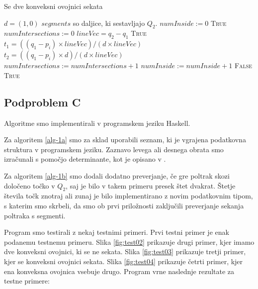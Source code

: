 \documentclass{article}
\begin{document}
\begin{algorithm}
	\caption{Se dve konveksni ovojnici sekata}
	\label{alg-1b}

	\begin{algorithmic}[1]
			\State $d = (1, 0)$
			\State $segments$ so daljice, ki sestavljajo $Q_2$.
			\State $numInside := 0$
				 \Return \textsc{True}
				\EndIf
				\State $numIntersections := 0$
				\State $lineVec = q_2 - q_1$
						 \Return \textsc{True}
						\EndIf
					\EndIf
					\State $t_1 = ((q_1 - p_i) \times lineVec) / (d \times lineVec)$
					\State $t_2 = ((q_1 - p_i) \times d) / (d \times lineVec)$
						\State $numIntersections := numIntersections + 1$
					\EndIf
				\EndFor
					\State $numInside := numInside + 1$
				\EndIf
			\EndFor
				\State \Return \textsc{False}
			\Else
				\State \Return \textsc{True}
			\EndIf

		\EndFunction
	\end{algorithmic}
\end{algorithm}


\subsection{Podproblem C}

Algoritme smo implementirali v programskem jeziku Haskell.

Za algoritem \ref{alg-1a} smo za sklad uporabili seznam, ki je vgrajena
podatkovna struktura v programskem jeziku. Zaznavo levega ali desnega obrata
smo izračunali s pomočjo determinante, kot je opisano v
\cite{cormen2009introduction}.

Za algoritem \ref{alg-1b} smo dodali dodatno preverjanje, če gre poltrak skozi
določeno točko v $Q_2$, saj je bilo v takem primeru presek štet dvakrat.
Štetje števila točk znotraj ali zunaj je bilo implementirano z novim podatkovnim
tipom, s katerim smo skrbeli, da smo ob prvi priložnosti zaključili preverjanje
sekanja poltraka s segmenti.

Program smo testirali z nekaj testnimi primeri. Prvi testni primer je enak
podanemu testnemu primeru. Slika \ref{fig:test02} prikazuje drugi primer, kjer
imamo dve konveksni ovojnici, ki se ne sekata. Slika \ref{fig:test03} prikazuje
tretji primer, kjer se konveksni ovojnici sekata. Slika \ref{fig:test04}
prikazuje četrti primer, kjer ena konveksna ovojnica vsebuje drugo. Program vrne
naslednje rezultate za testne primere:
\end{document}
